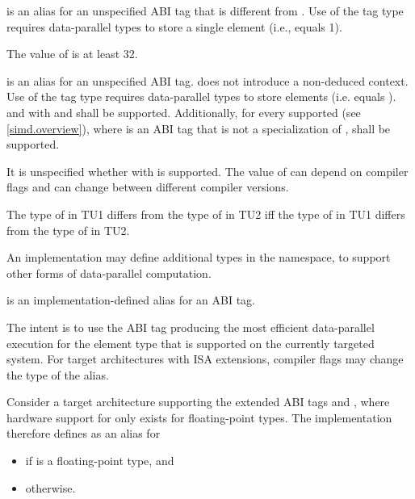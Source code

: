 \pnum
{} is an alias for an unspecified ABI tag that is different from .
Use of the  tag type requires data-parallel types to store a single element (i.e.,  equals 1).

\pnum
The value of  is at least 32.

\pnum
{} is an alias for an unspecified ABI tag.
 does not introduce a non-deduced context.
Use of the  tag type requires data-parallel types to store 
elements (i.e.  equals
).  and  with  and  shall be supported.
Additionally, for every supported  (see \ref{simd.overview}), where 
is an ABI tag that is not a specialization of ,  shall be supported.

\pnum
\begin{note}It is unspecified whether  with  is supported. The value of  can depend on compiler flags and can change between different compiler versions.\end{note}

\pnum
  The type of  in TU1 differs from the type of
   in TU2 iff the type of  in TU1 differs from
  the type of  in TU2.

\pnum
An implementation may define additional  types in the  namespace, to support other forms of data-parallel computation.

\pnum
{} is an implementation-defined alias for an ABI tag. \begin{note}The intent is to use the ABI tag producing the most efficient data-parallel execution for the element type  that is supported on the currently targeted system. For target architectures with ISA extensions, compiler flags may change the type of the  alias.\end{note}
\begin{example}
  Consider a target architecture supporting the extended ABI tags  and , where hardware support for  only exists for floating-point types. The implementation therefore defines  as an alias for
  \begin{itemize}
    \item {} if  is a floating-point type, and
    \item {} otherwise.
  \end{itemize}
\end{example}

